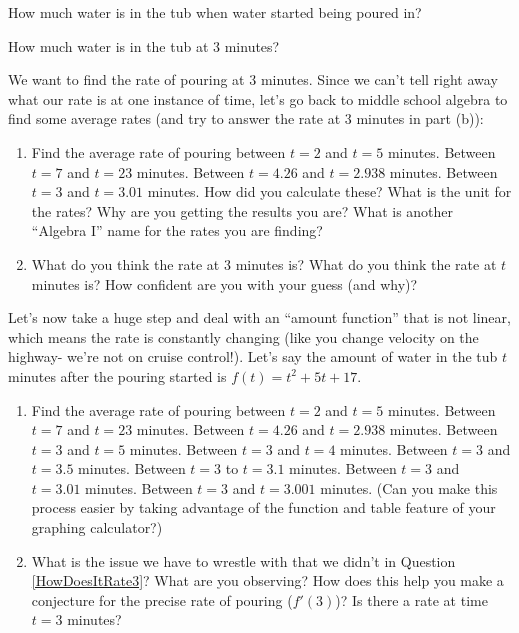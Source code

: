 \documentclass[handout]{ximera}
\begin{document}
\begin{question}
How much water is in the tub when water started being poured in?
\end{question}

\begin{question}
How much water is in the tub at 3 minutes?
\end{question}


\begin{question} \label{HowDoesItRate3}
We want to find the rate of pouring at $3$ minutes. Since we can't tell right away what our rate is at one instance of time, let's go back to middle school algebra to find some average rates (and try to answer the rate at 3 minutes in part (b)):
\begin{enumerate}
    \item Find the average rate of pouring between $t=2$ and $t=5$ minutes.  Between $t = 7$ and $t=23$ minutes.  Between $t=4.26$ and $t=2.938$ minutes.  Between $t=3$ and $t = 3.01$ minutes.  How did you calculate these?  What is the unit for the rates?  Why are you getting the results you are?  What is another ``Algebra I'' name for the rates you are finding?
    \item What do you think the rate at $3$ minutes is?  What do you think the rate at $t$ minutes is?  How confident are you with your guess (and why)?
\end{enumerate}
\end{question}


\begin{question} \label{HowDoesItRate4}
Let's now take a huge step and deal with an ``amount function'' that is not linear, which means the rate is constantly changing (like you change velocity on the highway- we're not on cruise control!).  Let's say the amount of water in the tub $t$ minutes after the pouring started is  $f(t) = t^2+5t+17$. 
\begin{enumerate} 
\item    Find the average rate of pouring between $t=2$ and $t=5$ minutes.  Between $t = 7$ and $t=23$ minutes.  Between $t=4.26$ and $t=2.938$ minutes.  Between $t=3$ and $t=5$ minutes.  Between $t=3$ and $t=4$ minutes.  Between $t=3$ and $t=3.5$ minutes.  Between $t=3$ to $t=3.1$ minutes.  Between $t=3$ and $t=3.01$ minutes.  Between $t=3$ and $t=3.001$ minutes.  (Can you make this process easier by taking advantage of the function and table feature of your graphing calculator?)
\item     What is the issue we have to wrestle with that we didn't in Question \ref{HowDoesItRate3}?  What are you observing?  How does this help you make a conjecture for the precise rate of pouring ($f'(3)$)? Is there a rate at time $t=3$ minutes?
     \end{enumerate}
\end{question}
\end{document}
